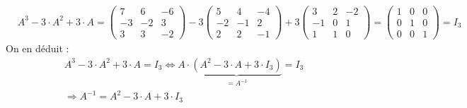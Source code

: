 {{$$\begin{aligned}
		& A^3-3 \cdot A^2+3 \cdot A=\left(\begin{array}{ccc}
			7 & 6 & -6 \\
			-3 & -2 & 3 \\
			3 & 3 & -2
		\end{array}\right)-3\left(\begin{array}{ccc}
			5 & 4 & -4 \\
			-2 & -1 & 2 \\
			2 & 2 & -1
		\end{array}\right)+3\left(\begin{array}{ccc}
			3 & 2 & -2 \\
			-1 & 0 & 1 \\
			1 & 1 & 0
		\end{array}\right)=\left(\begin{array}{lll}
			1 & 0 & 0 \\
			0 & 1 & 0 \\
			0 & 0 & 1
		\end{array}\right)=I_3
	\end{aligned}
	$$
	On en déduit :
	$$
	\begin{gathered}
		A^3-3 \cdot A^2+3 \cdot A=I_3 \Leftrightarrow A \cdot \underbrace{\left(A^2-3 \cdot A+3 \cdot I_3\right)}_{=A^{-1}}=I_3 \\
		\Rightarrow A^{-1}=A^2-3 \cdot A+3 \cdot I_3
	\end{gathered}
	$$ }}
